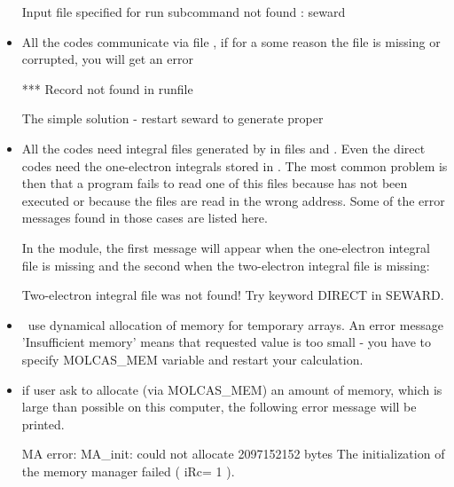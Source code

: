 \begin{itemize}
\begin{sourcelisting}
 Input file specified for run subcommand not found : seward
\end{sourcelisting}


\item All the codes communicate via file , if for a some reason
the file is missing or corrupted, you will get an error 

\begin{sourcelisting}
***    Record not found in runfile
\end{sourcelisting}

 The simple solution - restart seward to generate proper 


\item All the codes need integral files generated by  in
      files  and .
      Even the direct codes need the one-electron integrals stored
      in . The most common problem is then that a program
      fails to read one of this files because  has not
      been executed or because the files are read in the wrong address.
      Some of the error messages found in those cases are listed here.
    
      In the  module, the first message will appear when
      the one-electron integral file is missing and the second when 
      the two-electron integral file is missing:

\begin{sourcelisting}
Two-electron integral file was not found!
 Try keyword DIRECT in SEWARD.
\end{sourcelisting}

\item  \molcas\ use dynamical allocation of memory for temporary arrays.
 An error message 'Insufficient memory' means that requested value
 is too small - you have to specify MOLCAS\_MEM variable and restart your
 calculation. 
 
 \item if user ask to allocate (via MOLCAS\_MEM) an amount of memory, 
 which is large than possible on this computer, the following error message
 will be printed.
 
\begin{sourcelisting}
MA error: MA_init: could not allocate 2097152152 bytes
The initialization of the memory manager failed ( iRc=  1 ).
\end{sourcelisting}
 


\end{itemize}
